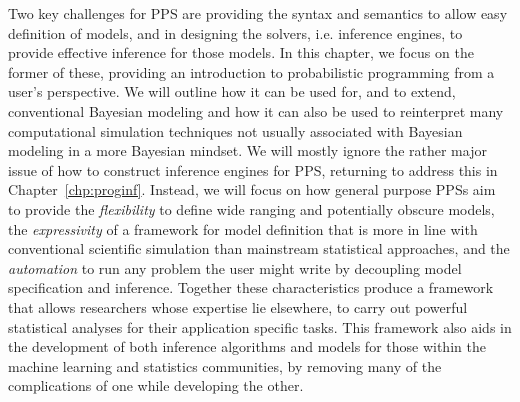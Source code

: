 Two key challenges for PPS are providing the
syntax and semantics to allow easy definition of models, and in designing the solvers, i.e.
inference engines, to provide effective inference for those models.
In this chapter, we focus on the former of these, providing an introduction to 
probabilistic programming from a user's perspective.  We will outline how it can be used for, and
to extend, conventional Bayesian modeling and how it can also be used to reinterpret many computational simulation
techniques not usually associated with Bayesian modeling in a more Bayesian mindset.
We will mostly ignore the rather major issue of how to construct inference engines for PPS, returning to address this in Chapter~\ref{chp:proginf}.
Instead, we will focus on how general purpose PPSs aim to  provide 
the \emph{flexibility} to define
wide ranging and potentially obscure models, the \emph{expressivity} of a framework for 
model definition that is more in line with conventional scientific simulation than mainstream 
statistical approaches, and the \emph{automation} to  run any problem the user might write
by decoupling model specification and inference.
Together these characteristics produce a framework that allows researchers whose expertise 
lie elsewhere, to carry out powerful statistical analyses for their application specific tasks.  
This framework also aids in the development of both inference
algorithms and models for those within the machine learning and statistics communities,
by removing many of the complications of one while developing the other.
%

